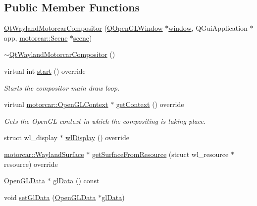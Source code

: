 \subsection*{Public Member Functions}
\begin{DoxyCompactItemize}
\item 
\hyperlink{classqtmotorcar_1_1QtWaylandMotorcarCompositor_a0de2ac0cbe6d725a501375a84573c470}{Qt\-Wayland\-Motorcar\-Compositor} (\hyperlink{classQOpenGLWindow}{Q\-Open\-G\-L\-Window} $\ast$\hyperlink{structwindow}{window}, Q\-Gui\-Application $\ast$app, \hyperlink{classmotorcar_1_1Scene}{motorcar\-::\-Scene} $\ast$\hyperlink{classqtmotorcar_1_1QtWaylandMotorcarCompositor_a8bb6c8e6a7acad99b814b192534f3ee2}{scene})
\item 
\hyperlink{classqtmotorcar_1_1QtWaylandMotorcarCompositor_a8d0178c57bdbe03ef7e4db6e13900950}{$\sim$\-Qt\-Wayland\-Motorcar\-Compositor} ()
\item 
virtual int \hyperlink{classqtmotorcar_1_1QtWaylandMotorcarCompositor_a34cd3f4acc535584eb066d3fe32ed9bf}{start} () override
\begin{DoxyCompactList}\small\item\em Starts the compositor main draw loop. \end{DoxyCompactList}\item 
virtual \hyperlink{classmotorcar_1_1OpenGLContext}{motorcar\-::\-Open\-G\-L\-Context} $\ast$ \hyperlink{classqtmotorcar_1_1QtWaylandMotorcarCompositor_a1fb6e9d59011be2912bc9cf51496b191}{get\-Context} () override
\begin{DoxyCompactList}\small\item\em Gets the Open\-G\-L context in which the compositing is taking place. \end{DoxyCompactList}\item 
struct wl\-\_\-display $\ast$ \hyperlink{classqtmotorcar_1_1QtWaylandMotorcarCompositor_a9e29a67d95d6aa74a08b2a3deed19dfe}{wl\-Display} () override
\item 
\hyperlink{classmotorcar_1_1WaylandSurface}{motorcar\-::\-Wayland\-Surface} $\ast$ \hyperlink{classqtmotorcar_1_1QtWaylandMotorcarCompositor_ad4262e2dce170d25080e5c205fecc5ca}{get\-Surface\-From\-Resource} (struct wl\-\_\-resource $\ast$resource) override
\item 
\hyperlink{classOpenGLData}{Open\-G\-L\-Data} $\ast$ \hyperlink{classqtmotorcar_1_1QtWaylandMotorcarCompositor_a50bc0b510d20d0298b9e164804543f81}{gl\-Data} () const 
\item 
void \hyperlink{classqtmotorcar_1_1QtWaylandMotorcarCompositor_a0122a32ec769e7190b3a2e0a838f0053}{set\-Gl\-Data} (\hyperlink{classOpenGLData}{Open\-G\-L\-Data} $\ast$\hyperlink{classqtmotorcar_1_1QtWaylandMotorcarCompositor_a50bc0b510d20d0298b9e164804543f81}{gl\-Data})

\end{DoxyCompactItemize}
